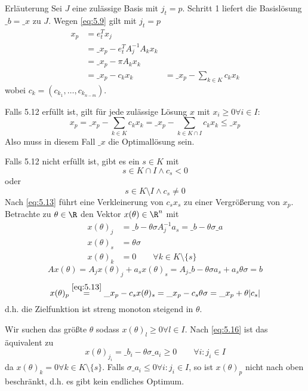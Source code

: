 \documentclass[a4paper]{scrartcl}
\numberwithin{equation}{section}
\begin{document}
\begin{note}{Erläuterung}
	Sei $J$ eine zulässige Basis mit $j_t=p$.
	Schritt 1 liefert die Basislösung $\_b = \_x$ zu $J$.
	Wegen \ref{eq:5.9} gilt mit $j_t = p$
	\begin{align*}
		x_p &= e_t^Tx_j \\
			   &= \_x_p - e_t^T A_j^{-1}A_kx_k \tag{5.13}\label{eq:5.13} \\
			   &= \_x_p - \pi A_kx_k \\
			   &= \_x_p - c_kx_k
		&= \_x_p - \sum_{k\in K}c_k x_k
	\end{align*}
	\setcounter{equation}{13}
	wobei $c_k = (c_{k_1}, \dotsc, c_{k_{n-m}})$.
	
	Falls 5.12 erfüllt ist, gilt für jede zulässige Lösung $x$ mit $x_i \ge 0 \forall i\in I$: %
	\[
		x_p = \_x_p - \sum_{k\in K}c_k x_k = \_x_p - \sum_{k\in K\cap I}c_k x_k \le \_x_p
	\]
	Also muss in diesem Fall $\_x$ die Optimallösung sein.
	
	Falls 5.12 nicht erfüllt ist, gibt es ein $s\in K$ mit %
	\begin{equation}
		\label{eq:5.14} 
		s\in K \cap I \land c_s < 0
	\end{equation}
	oder
	\begin{equation}
		\label{eq:5.15}
		s\in K\setminus I \land c_s \neq 0
	\end{equation}
	Nach \ref{eq:5.13} führt eine Verkleinerung von $c_sx_s$ zu einer Vergrößerung von $x_p$.
	Betrachte zu $\theta\in \R$ den Vektor $x(\theta) \in \R^n$ mit
	\begin{align*}
		x(\theta)_j &= \_b - \theta \sigma A_j^{-1}a_s = \_b - \theta \sigma \_a\\
		x(\theta)_s &= \theta \sigma\\
		x(\theta)_k &= 0 \qquad \forall k\in K\setminus \{s\}
	\end{align*}
	\[
		Ax(\theta) = A_j x(\theta)_j + a_s x(\theta)_s = A_j\_b - \theta \sigma a_s + a_s \theta \sigma = b
	\]
	\begin{equation*}
		x(\theta)_p \stackrel{\ref{eq:5.13}}= \_x_p -c_s x(\theta)_s = \_x_p - c_s \theta \sigma = \_x_p + \theta |c_s|
	\end{equation*}
	d.h. die Zielfunktion ist streng monoton steigend in $\theta$.

	Wir suchen das größte $\theta$ sodass $x(\theta)_l \ge 0 \forall l\in I$.
	Nach \ref{eq:5.16} ist das äquivalent zu
	\begin{equation}
		\label{eq:5.16}
		x(\theta)_{j_i} = \_b_i - \theta \sigma \_a_i \ge 0 \qquad \forall i : j_i \in I
	\end{equation}
	da $x(\theta)_k=0 \forall k\in K\setminus \{s\}$.
	Falls $\sigma \_a_i \le 0 \forall i: j_i \in I$, so ist $x(\theta)_p$ nicht nach oben beschränkt, d.h. es gibt kein endliches Optimum.


\end{note}
\end{document}
